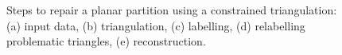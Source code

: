 \begin{figure}
\caption[Steps to repair a planar partition using a constrained triangulation]{Steps to repair a planar partition using a constrained triangulation: (a) input data, (b) triangulation, (c) labelling, (d) relabelling problematic triangles, (e) reconstruction.}
\label{fig:pprepair-workflow}
\end{figure}

